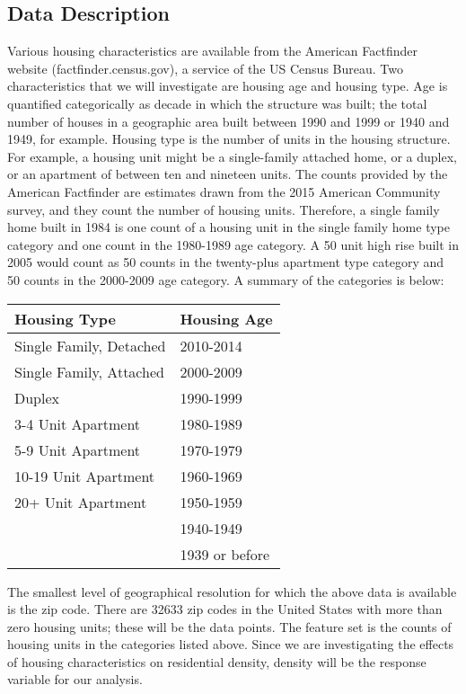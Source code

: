 \documentclass{article}
\begin{document}
\subsection*{Data Description}
Various housing characteristics are available from the American Factfinder website (factfinder.census.gov), a service of the US Census Bureau. Two characteristics that we will investigate are housing age and housing type. Age is quantified categorically as decade in which the structure was built; the total number of houses in a geographic area built between 1990 and 1999 or 1940 and 1949, for example. Housing type is the number of units in the housing structure. For example, a housing unit might be a single-family attached home, or a duplex, or an apartment of between ten and nineteen units. The counts provided by the American Factfinder are estimates drawn from the 2015 American Community survey, and they count the number of housing units. Therefore, a single family home built in 1984 is one count of a housing unit in the single family home type category and one count in the 1980-1989 age category. A 50 unit high rise built in 2005 would count as 50 counts in the twenty-plus apartment type category and 50 counts in the 2000-2009 age category. A summary of the categories is below:

\begin{center}\begin{tabular}{|l|l|}
\hline Housing Type&Housing Age\\
\hline Single Family, Detached&2010-2014\\
Single Family, Attached&2000-2009\\
Duplex&1990-1999\\
3-4 Unit Apartment&1980-1989\\
5-9 Unit Apartment&1970-1979\\
10-19 Unit Apartment&1960-1969\\
20+ Unit Apartment& 1950-1959\\
&1940-1949\\
&1939 or before\\
\hline\end{tabular}\end{center}

The smallest level of geographical resolution for which the above data is available is the zip code. There are 32633 zip codes in the United States with more than zero housing units; these will be the data points. The feature set is the counts of housing units in the categories listed above. Since we are investigating the effects of housing characteristics on residential density, density will be the response variable for our analysis.
\end{document}
